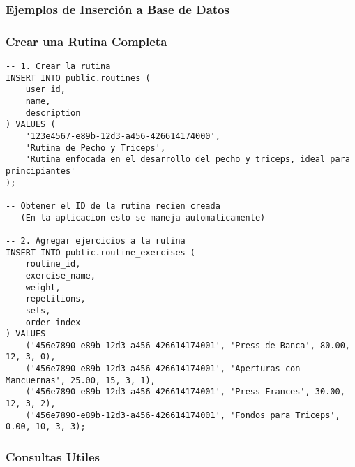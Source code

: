 \documentclass[12pt,a4paper]{article}
\begin{document}
\subsubsection{Ejemplos de Inserción a Base de Datos}



\subsubsection{Crear una Rutina Completa}

\begin{lstlisting}[caption=Ejemplo de creacion de rutina completa, basicstyle=\ttfamily]
-- 1. Crear la rutina
INSERT INTO public.routines (
    user_id,
    name,
    description
) VALUES (
    '123e4567-e89b-12d3-a456-426614174000',
    'Rutina de Pecho y Triceps',
    'Rutina enfocada en el desarrollo del pecho y triceps, ideal para principiantes'
);

-- Obtener el ID de la rutina recien creada
-- (En la aplicacion esto se maneja automaticamente)

-- 2. Agregar ejercicios a la rutina
INSERT INTO public.routine_exercises (
    routine_id,
    exercise_name,
    weight,
    repetitions,
    sets,
    order_index
) VALUES 
    ('456e7890-e89b-12d3-a456-426614174001', 'Press de Banca', 80.00, 12, 3, 0),
    ('456e7890-e89b-12d3-a456-426614174001', 'Aperturas con Mancuernas', 25.00, 15, 3, 1),
    ('456e7890-e89b-12d3-a456-426614174001', 'Press Frances', 30.00, 12, 3, 2),
    ('456e7890-e89b-12d3-a456-426614174001', 'Fondos para Triceps', 0.00, 10, 3, 3);
\end{lstlisting}

\subsubsection{Consultas Utiles}
\end{document}
